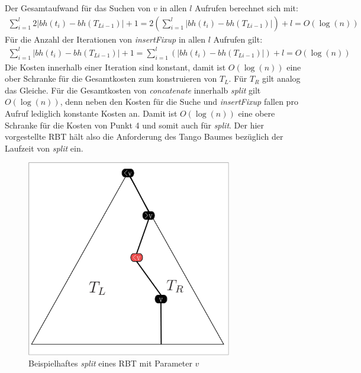 \documentclass[a4paper,12pt]{article}
\begin{document}
\noindent Der Gesamtaufwand für das Suchen von $v$ in allen $l$ Aufrufen berechnet sich mit: 
\begin{align*}
\sum_{i = 1}^{l}  2 \vert\mathit{bh}(t_{i}) -\mathit{bh}(T_{Li-1}) \vert + 1 =
2 \left( \sum_{i = 1}^{l}   \vert\mathit{bh}(t_{i}) -\mathit{bh}(T_{Li-1}) \vert \right)+ l
= O \left(\log \left(n \right) \right)
\end{align*}
\noindent Für die Anzahl der Iterationen von \textit{insertFixup} in allen $l$ Aufrufen gilt: 
\begin{align*}
\sum_{i = 1}^{l}   \vert\mathit{bh}(t_{i}) -\mathit{bh}(T_{Li-1}) \vert +1 =
\sum_{i = 1}^{l}  \left( \vert\mathit{bh}(t_{i}) -\mathit{bh}(T_{Li-1}) \vert \right) + l 
= O \left(\log \left(n \right) \right)
\end{align*}
Die Kosten innerhalb einer Iteration sind konstant, damit ist  $O \left(\log \left(n \right) \right)$ eine ober Schranke für die Gesamtkosten zum konstruieren von $T_L$. Für $T_R$ gilt analog das Gleiche. Für die Gesamtkosten von \textit{concatenate} innerhalb \textit{split} gilt $O \left(\log \left(n \right) \right)$, denn neben den Kosten für die Suche und \textit{insertFixup} fallen pro Aufruf lediglich konstante Kosten an. Damit ist $O \left(\log \left(n \right) \right)$ eine obere Schranke für die Kosten von Punkt 4 und somit auch für \textit{split}. Der hier vorgestellte RBT hält also die Anforderung des Tango Baumes bezüglich der Laufzeit von \textit{split} ein.


\begin{figure}[H]
	\centering
	\includegraphics[width=0.8\textwidth]{"Medien/RotSchwarzBaum/aufteilen"}
	\caption{Beispielhaftes \textit{split} eines RBT mit Parameter $v$ }
	\label{fig:aufteilen}
\end{figure}
\end{document}
